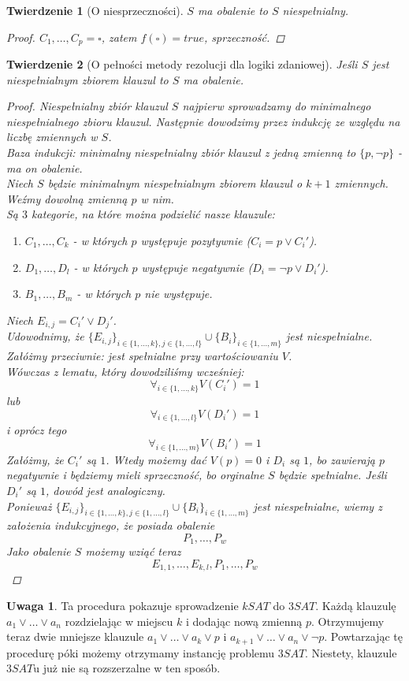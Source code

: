 \documentclass[10pt,a4paper]{article}
\theoremstyle{plain}
\newtheorem{theorem}{Twierdzenie}
\theoremstyle{definition}
\newtheorem*{remark}{Uwaga}
\begin{document}
\begin{theorem}[O niesprzeczności]
$S$ ma obalenie to $S$ niespełnialny.
\begin{proof}
$C_1, \ldots, C_p = \square$, zatem $f(\square) = true$, sprzeczność.
\end{proof}
\end{theorem}
\begin{theorem}[O pełności metody rezolucji dla logiki zdaniowej]
Jeśli $S$ jest niespełnialnym zbiorem klauzul to $S$ ma obalenie.
\begin{proof}
Niespełnialny zbiór klauzul $S$ najpierw sprowadzamy do minimalnego niespełnialnego zbioru klauzul.
Następnie dowodzimy przez indukcję ze względu na liczbę zmiennych w $S$.\\
Baza indukcji: minimalny niespełnialny zbiór klauzul z jedną zmienną to $\{p, \lnot p\}$ - ma on obalenie.\\
Niech $S$ będzie minimalnym niespełnialnym zbiorem klauzul o $k+1$ zmiennych. Weźmy dowolną zmienną $p$ w nim.\\
Są $3$ kategorie, na które można podzielić nasze klauzule:
\begin{enumerate}
 \item $C_1, \ldots, C_k$ - w których $p$ występuje pozytywnie ($C_i = p \vee C_i'$).
 \item $D_1, \ldots, D_l$ - w których $p$ występuje negatywnie ($D_i = \lnot p \vee D_i'$).
 \item $B_1, \ldots, B_m$ - w których $p$ nie występuje.
\end{enumerate}
Niech $E_{i,j} = C_i' \vee D_j'$.\\
Udowodnimy, że $\{E_{i,j}\}_{i\in\{1,\ldots,k\},j\in\{1,\ldots,l\}} \cup \{B_i\}_{i\in\{1,\ldots,m\}}$ jest niespełnialne.\\
Załóżmy przeciwnie: jest spełnialne przy wartościowaniu $V$.\\
Wówczas z lematu, który dowodziliśmy wcześniej:
$$\forall_{i\in\{1,\ldots,k\}} V(C_i') = 1$$
lub
$$\forall_{i\in\{1,\ldots,l\}} V(D_i') = 1$$
i oprócz tego
$$\forall_{i\in\{1,\ldots,m\}} V(B_i') = 1$$
Załóżmy, że $C_i'$ są $1$. Wtedy możemy dać $V(p) = 0$ i $D_i$ są $1$, bo zawierają $p$ negatywnie i będziemy mieli
sprzeczność, bo orginalne $S$ będzie spełnialne.
Jeśli $D_i'$ są $1$, dowód jest analogiczny.\\
Ponieważ $\{E_{i,j}\}_{i\in\{1,\ldots,k\},j\in\{1,\ldots,l\}} \cup \{B_i\}_{i\in\{1,\ldots,m\}}$ jest niespełnialne,
wiemy z założenia indukcyjnego, że posiada obalenie
$$P_1,\ldots,P_w$$
Jako obalenie $S$ możemy wziąć teraz
$$E_{1,1},\ldots,E_{k,l},P_1,\ldots,P_w$$
\end{proof}
\end{theorem}
\begin{remark}
Ta procedura pokazuje sprowadzenie $kSAT$ do $3SAT$. Każdą klauzulę $a_1 \vee \ldots \vee a_n$
rozdzielając w miejscu $k$ i dodając nową zmienną $p$. Otrzymujemy teraz dwie mniejsze klauzule
$a_1 \vee \ldots \vee a_k \vee p$ i $a_{k+1} \vee \ldots \vee a_n \vee \lnot p$.
Powtarzając tę procedurę póki możemy otrzymamy instancję problemu $3SAT$.
Niestety, klauzule $3SAT$u już nie są rozszerzalne w ten sposób.
\end{remark}
\end{document}
